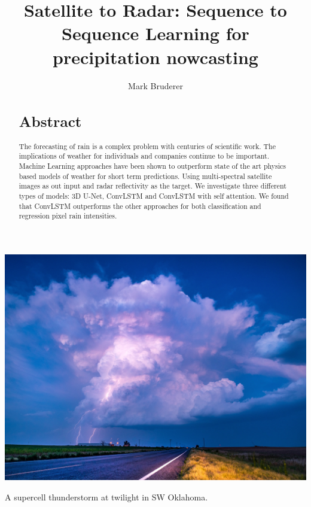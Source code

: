 \documentclass[acmtog, screen, balance]{acmart}
\begin{document}
\title{Satellite to Radar: Sequence to Sequence Learning for precipitation nowcasting}

\author{Mark Bruderer}

\renewcommand{\shortauthors}{Mark Bruderer}

\begin{abstract}
\section*{Abstract}
The forecasting of rain is a complex problem with centuries of scientific work.
The implications of weather for individuals and companies continue to be important.
Machine Learning approaches have been shown to outperform state of the art physics based models of weather for short term predictions.
Using multi-spectral satellite images as out input and radar reflectivity as the target.  
We investigate three different types of models: 3D U-Net, ConvLSTM and ConvLSTM with self attention.
We found that ConvLSTM outperforms the other approaches for both classification and regression pixel rain intensities.
\end{abstract}




\begin{teaserfigure}
    \renewcommand{\thefootnote}{\arabic{footnote}}
    \includegraphics*[width=\textwidth, trim=0in 0.0in 0in 16.0in]{images/lightning.jpg}
    \caption{A supercell thunderstorm at twilight in SW Oklahoma.\protect\footnotemark}
    \label{fig:teaser}
\end{teaserfigure}
\end{document}
